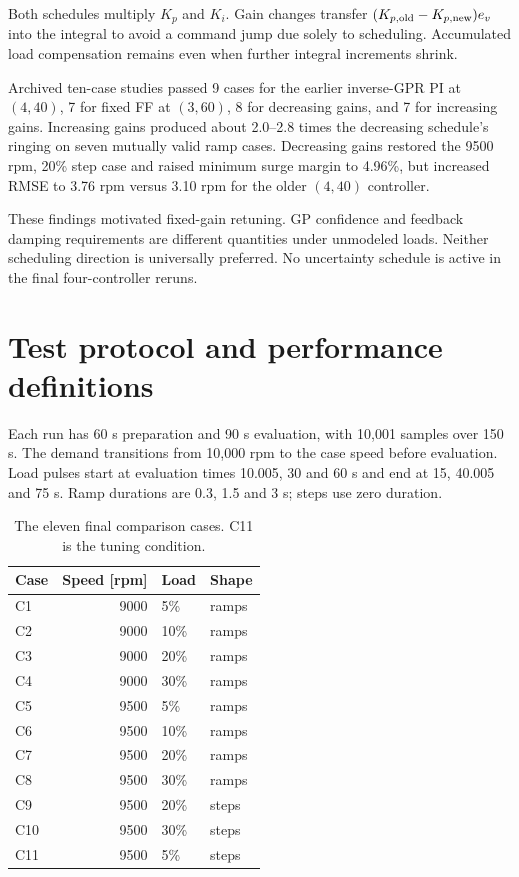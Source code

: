 \documentclass[11pt,a4paper]{article}
\begin{document}
Both schedules multiply $K_p$ and $K_i$. Gain changes transfer $(K_{p,\rm old}-K_{p,\rm new})e_v$ into the integral to avoid a command jump due solely to scheduling. Accumulated load compensation remains even when further integral increments shrink.

Archived ten-case studies passed 9 cases for the earlier inverse-GPR PI at $(4,40)$, 7 for fixed FF at $(3,60)$, 8 for decreasing gains, and 7 for increasing gains. Increasing gains produced about 2.0--2.8 times the decreasing schedule's ringing on seven mutually valid ramp cases. Decreasing gains restored the 9500 rpm, 20\% step case and raised minimum surge margin to 4.96\%, but increased RMSE to 3.76 rpm versus 3.10 rpm for the older $(4,40)$ controller.

These findings motivated fixed-gain retuning. GP confidence and feedback damping requirements are different quantities under unmodeled loads. Neither scheduling direction is universally preferred. No uncertainty schedule is active in the final four-controller reruns.

\section{Test protocol and performance definitions}
Each run has 60 s preparation and 90 s evaluation, with 10,001 samples over 150 s. The demand transitions from 10,000 rpm to the case speed before evaluation. Load pulses start at evaluation times 10.005, 30 and 60 s and end at 15, 40.005 and 75 s. Ramp durations are 0.3, 1.5 and 3 s; steps use zero duration.
\begin{table}[H]\centering\small
\begin{tabular}{@{}lrll@{}}\toprule
Case & Speed [rpm] & Load & Shape\\\midrule
C1 & 9000 & 5\% & ramps\\
C2 & 9000 & 10\% & ramps\\
C3 & 9000 & 20\% & ramps\\
C4 & 9000 & 30\% & ramps\\
C5 & 9500 & 5\% & ramps\\
C6 & 9500 & 10\% & ramps\\
C7 & 9500 & 20\% & ramps\\
C8 & 9500 & 30\% & ramps\\
C9 & 9500 & 20\% & steps\\
C10 & 9500 & 30\% & steps\\
C11 & 9500 & 5\% & steps\\
\bottomrule\end{tabular}\caption{The eleven final comparison cases. C11 is the tuning condition.}\end{table}
\end{document}
